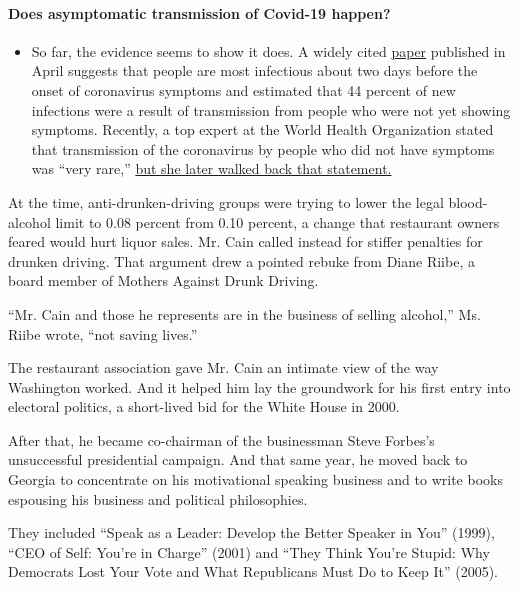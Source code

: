 \begin{itemize}
{  \paragraph{Does asymptomatic transmission of Covid-19
  happen?}\label{does-asymptomatic-transmission-of-covid-19-happen}}

  \begin{itemize}
  \tightlist
  \item
    So far, the evidence seems to show it does. A widely cited
    \href{https://www.nature.com/articles/s41591-020-0869-5}{paper}
    published in April suggests that people are most infectious about
    two days before the onset of coronavirus symptoms and estimated that
    44 percent of new infections were a result of transmission from
    people who were not yet showing symptoms. Recently, a top expert at
    the World Health Organization stated that transmission of the
    coronavirus by people who did not have symptoms was ``very rare,''
    \href{https://www.nytimes3xbfgragh.onion/2020/06/09/world/coronavirus-updates.html?action=click\&pgtype=Article\&state=default\&region=MAIN_CONTENT_3\&context=storylines_faq\#link-1f302e21}{but
    she later walked back that statement.}
  \end{itemize}
\end{itemize}

At the time, anti-drunken-driving groups were trying to lower the legal
blood-alcohol limit to 0.08 percent from 0.10 percent, a change that
restaurant owners feared would hurt liquor sales. Mr. Cain called
instead for stiffer penalties for drunken driving. That argument drew a
pointed rebuke from Diane Riibe, a board member of Mothers Against Drunk
Driving.

``Mr. Cain and those he represents are in the business of selling
alcohol,'' Ms. Riibe wrote, ``not saving lives.''

The restaurant association gave Mr. Cain an intimate view of the way
Washington worked. And it helped him lay the groundwork for his first
entry into electoral politics, a short-lived bid for the White House in
2000.

After that, he became co-chairman of the businessman Steve Forbes's
unsuccessful presidential campaign. And that same year, he moved back to
Georgia to concentrate on his motivational speaking business and to
write books espousing his business and political philosophies.

They included ``Speak as a Leader: Develop the Better Speaker in You''
(1999), ``CEO of Self: You're in Charge'' (2001) and ``They Think You're
Stupid: Why Democrats Lost Your Vote and What Republicans Must Do to
Keep It'' (2005).

